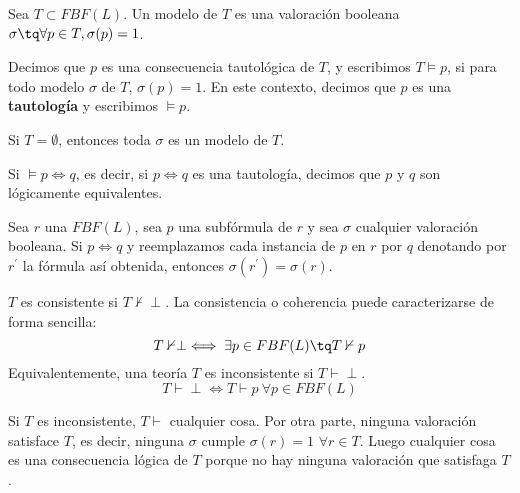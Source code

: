 \begin{defn}[Modelo]
	Sea $T\subset FBF(L)$. Un modelo de $T$ es una valoración booleana $\sigma \tq \forall p\in T, \sigma (p) = 1$.
\end{defn}

\begin{defn}
	Decimos que $p$ es una consecuencia tautológica de $T$, y escribimos $T\vDash p$, si para todo modelo $\sigma$ de $T$, $\sigma(p) = 1$. En este contexto, decimos que $p$ es una \textbf{tautología} y escribimos  $\vDash p$.
\end{defn}

\begin{obs}
	Si $T = \emptyset$, entonces toda $\sigma$ es un modelo de $T$.
\end{obs}

\newpage

\begin{defn}
	Si $\vDash p \iff q$, es decir, si $p\iff q$ es una tautología, decimos que $p$ y $q$ son lógicamente equivalentes.
\end{defn}

\begin{obs}
	Sea $r$ una $FBF(L)$, sea $p$ una subfórmula de $r$ y sea $\sigma$ cualquier valoración booleana. Si $p\iff q$ y reemplazamos cada instancia de $p$ en $r$ por $q$ denotando por $r^\prime$ la fórmula así obtenida, entonces $\sigma(r^\prime) = \sigma(r)$.
\end{obs}

\begin{defn}
 $T$ es consistente si $T\nvdash \perp$. La consistencia o coherencia puede caracterizarse de forma sencilla:
 $$T\nvdash\perp \iff \exists p\in FBF(L) \tq  T\nvdash p$$
 Equivalentemente, una teoría $T$ es inconsistente si $T\vdash \perp$.
 $$T\vdash\perp \iff T\vdash p\ \forall p\in FBF(L)$$

\end{defn}

\begin{obs}
	Si $T$ es inconsistente, $T\vdash$ cualquier cosa.
	Por otra parte, ninguna valoración satisface $T$, es decir, ninguna $\sigma$ cumple $\sigma(r) = 1$ $\forall r\in T$. Luego cualquier cosa es una consecuencia lógica de $T$ porque no hay ninguna valoración que satisfaga $T$.
\end{obs}

